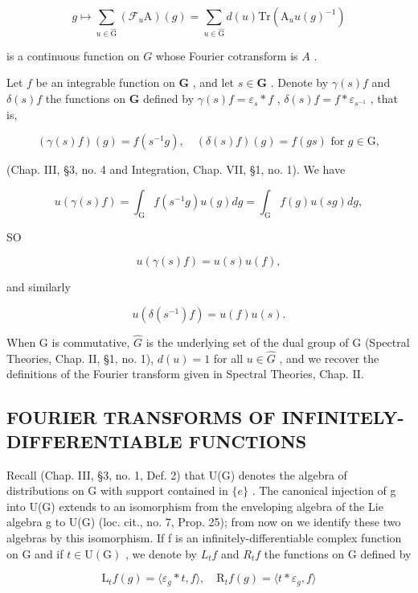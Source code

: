 \[
g \mapsto \sum_ {u \in \hat {\mathrm{G}}} (\mathcal {F} _ {u} \mathrm{A}) (g) = \sum_ {u \in \hat {\mathrm{G}}} d (u) \mathrm{Tr} (\mathrm{A} _ {u} u (g) ^ {- 1})
\]

is a continuous function on \(G\) whose Fourier cotransform is \(A\) .

Let \(f\) be an integrable function on \(\mathbf{G}\) , and let \(s \in \mathbf{G}\) . Denote by \(\gamma(s)f\) and \(\delta(s)f\) the functions on \(\mathbf{G}\) defined by \(\gamma(s)f = \varepsilon_s * f\) , \(\delta(s)f = f * \varepsilon_{s^{-1}}\) , that is,

\[
(\gamma (s) f) (g) = f (s ^ {- 1} g), \quad (\delta (s) f) (g) = f (g s) \text { for } g \in \mathrm{G},
\]

(Chap. III, §3, no. 4 and Integration, Chap. VII, §1, no. 1). We have

\[
u (\gamma (s) f) = \int_ {\mathrm{G}} f (s ^ {- 1} g) u (g) d g = \int_ {\mathrm{G}} f (g) u (s g) d g,
\]

SO

\[
u (\gamma (s) f) = u (s) u (f),\tag{12}
\]

and similarly

\[
u (\delta (s ^ {- 1}) f) = u (f) u (s).\tag{13}
\]

When G is commutative, \(\hat{G}\) is the underlying set of the dual group of G (Spectral Theories, Chap. II, §1, no. 1), \(d(u) = 1\) for all \(u \in \hat{G}\) , and we recover the definitions of the Fourier transform given in Spectral Theories, Chap. II.

\subsection{FOURIER TRANSFORMS OF INFINITELY-DIFFERENTIABLE FUNCTIONS}

Recall (Chap. III, §3, no. 1, Def. 2) that U(G) denotes the algebra of distributions on G with support contained in \(\{e\}\) . The canonical injection of g into U(G) extends to an isomorphism from the enveloping algebra of the Lie algebra g to U(G) (loc. cit., no. 7, Prop. 25); from now on we identify these two algebras by this isomorphism. If f is an infinitely-differentiable complex function on G and if \(t \in \mathrm{U}(\mathrm{G})\) , we denote by \(L_{t}f\) and \(R_{t}f\) the functions on G defined by

\[
\mathrm{L} _ {t} f (g) = \langle \varepsilon_ {g} * t, f \rangle , \quad \mathrm{R} _ {t} f (g) = \langle t * \varepsilon_ {g}, f \rangle
\]

